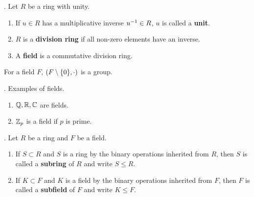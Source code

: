 . Let \(R\) be a ring with unity.
\begin{enumerate}
    \item {} If \(u \in R\) has a multiplicative inverse \(u ^{-1} \in R\), \(u\) is called a \textbf{unit}.
    \item {} \(R\) is a \textbf{division ring} if all non-zero elements have an inverse.
    \item {} A \textbf{field} is a commutative division ring.
\end{enumerate}

\rmk For a field \(F\), \((F \setminus \{0\}, \cdot)\) is a group.

\ex. Examples of fields.
\begin{enumerate}
    \item \(\mathbb{Q}, \mathbb{R}, \mathbb{C}\) are fields.
    \item \(\mathbb{Z}_p\) is a field if \(p\) is prime.
\end{enumerate}

. Let \(R\) be a ring and \(F\) be a field.
\begin{enumerate}
    \item {} If \(S \subset R\) and \(S\) is a ring by the binary operations inherited from \(R\), then \(S\) is called a \textbf{subring} of \(R\) and write \(S \leq R\).
    \item {} If \(K \subset F\) and \(K\) is a field by the binary operations inherited from \(F\), then \(F\) is called a \textbf{subfield} of \(F\) and write \(K \leq F\).
\end{enumerate}

\pagebreak
